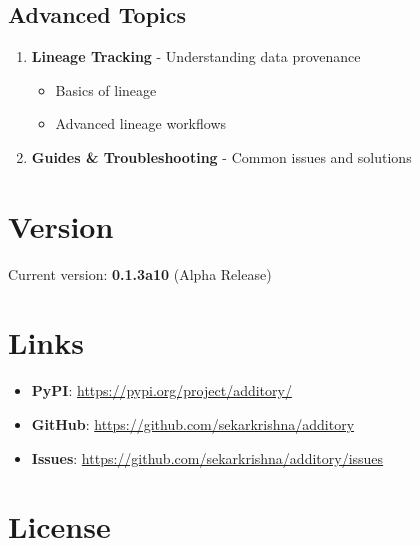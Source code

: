 \documentclass[
  letterpaper,
]{scrbook}
\providecommand{\tightlist}{%
  \setlength{\itemsep}{0pt}\setlength{\parskip}{0pt}}
\begin{document}
\subsection*{Advanced Topics}\label{advanced-topics}

\begin{enumerate}
\def\labelenumi{\arabic{enumi}.}
\setcounter{enumi}{4}
\tightlist
\item
  \textbf{Lineage Tracking} - Understanding data provenance

  \begin{itemize}
  \tightlist
  \item
    Basics of lineage
  \item
    Advanced lineage workflows
  \end{itemize}
\item
  \textbf{Guides \& Troubleshooting} - Common issues and solutions
\end{enumerate}

\section*{Version}\label{version}


Current version: \textbf{0.1.3a10} (Alpha Release)

\section*{Links}\label{links}


\begin{itemize}
\tightlist
\item
  \textbf{PyPI}: \url{https://pypi.org/project/additory/}
\item
  \textbf{GitHub}: \url{https://github.com/sekarkrishna/additory}
\item
  \textbf{Issues}: \url{https://github.com/sekarkrishna/additory/issues}
\end{itemize}

\section*{License}\label{license}

\end{document}
